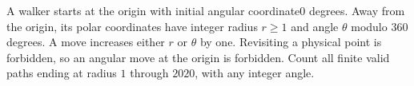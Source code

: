 A walker starts at the origin with initial angular coordinate0 degrees. Away from the origin, its polar coordinates have integer radius $r\ge1$ and angle $\theta$ modulo $360$ degrees. A move increases either $r$ or $\theta$ by one. Revisiting a physical point is forbidden, so an angular move at the origin is forbidden. Count all finite valid paths ending at radius $1$ through $2020$, with any integer angle.
